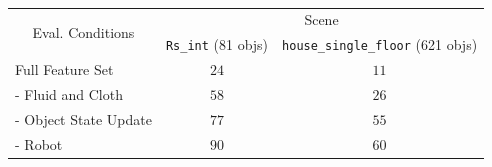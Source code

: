 \begin{table}[t]
    \centering
    \begin{tabular}{l|cc}
    \toprule
    \multicolumn{1}{c|}{\multirow{2}{*}{Eval. Conditions}} & \multicolumn{2}{c}{Scene} \\
    \multicolumn{1}{c|}{} & \texttt{Rs\_int} (81 objs) & \texttt{house\_single\_floor} (621 objs) \\ \midrule
    Full Feature Set & $24$ & $11$ \\
    - Fluid and Cloth & $58$ & $26$ \\
    - Object State Update & $77$ & $55$ \\ 
    - Robot & $90$ & $60$ \\ \bottomrule
    \end{tabular}
    \caption{}
    \label{tab:benchmark}
\end{table}




